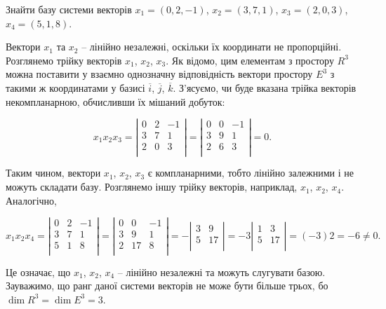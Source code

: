 \begin{problem}
	Знайти базу системи векторів $x_1 = (0,2,-1)$, $x_2 = (3,7,1)$, $x_3 = (2,0,3)$, $x_4 = (5,1,8)$.
\end{problem}
\begin{solution}
	Вектори $x_1$ та $x_2$ -- лінійно незалежні, оскільки їх координати не
	пропорційні. Розглянемо трійку векторів $x_1$, $x_2$, $x_3$. Як відомо, цим елементам з
	простору $R^3$ можна поставити у взаємно однозначну відповідність вектори
	простору $E^3$ з такими ж координатами у базисі $\overline{i}$, $\overline{j}$, $\overline{k}$. З’ясуємо, чи буде вказана
	трійка векторів некомпланарною, обчисливши їх мішаний добуток:

	$$x_1 x_2 x_3 = \left|\begin{matrix}
		0 & 2 & -1 \\
		3 & 7 & 1 \\
		2 & 0 & 3 \\
	\end{matrix}\right| = \left|\begin{matrix}
		0 & 0 & -1 \\
		3 & 9 & 1 \\
		2 & 6 & 3 \\
	\end{matrix}\right| = 0.$$

	Таким чином, вектори $x_1$, $x_2$, $x_3$ є компланарними, тобто лінійно залежними і
	не можуть складати базу. Розглянемо іншу трійку векторів, наприклад, $x_1$, $x_2$, $x_4$.
	Аналогічно,
	
	$$x_1 x_2 x_4 = \left|\begin{matrix}
		0 & 2 & -1 \\
		3 & 7 & 1 \\
		5 & 1 & 8 \\
	\end{matrix}\right| = \left|\begin{matrix}
		0 & 0 & -1 \\
		3 & 9 & 1 \\
		2 & 17 & 8 \\
	\end{matrix}\right| = - \left|\begin{matrix}
		3 & 9 \\
		5 & 17 \\
	\end{matrix}\right| = -3 \left|\begin{matrix}
		1 & 3 \\
		5 & 17 \\
	\end{matrix}\right| = (-3) 2 = -6 \neq 0.$$

	Це означає, що $x_1$, $x_2$, $x_4$ -- лінійно незалежні та можуть слугувати базою.
	Зауважимо, що ранг даної системи векторів не може бути більше трьох, бо
	$\dim R^3 = \dim E^3 = 3$.
\end{solution}

